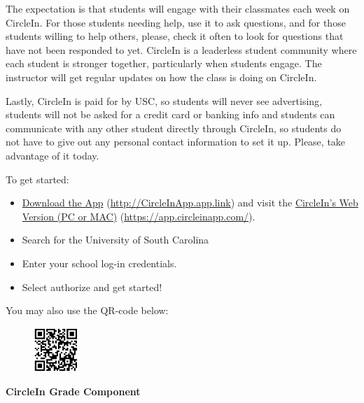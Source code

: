 \documentclass[11pt,letterpaper]{article}
\begin{document}
The expectation is that students will engage with their classmates each week on CircleIn. For those students needing help, use it to ask questions, and for those students willing to help others, please, check it often to look for questions that have not been responded to yet. CircleIn is a leaderless student community where each student is stronger together, particularly when students engage. The instructor will get regular updates on how the class is doing on CircleIn. \pspace

Lastly, CircleIn is paid for by USC, so students will never see advertising, students will not be asked for a credit card or banking info and students can communicate with any other student directly through CircleIn, so students do not have to give out any personal contact information to set it up. Please, take advantage of it today. \pspace





\newpage





To get started:
	\begin{itemize}
	\item \href{http://CircleInApp.app.link}{Download the App} (\url{http://CircleInApp.app.link}) and visit the \href{https://app.circleinapp.com/}{CircleIn's Web Version (PC or MAC)} (\url{https://app.circleinapp.com/}).
	\item Search for the University of South Carolina
	\item Enter your school log-in credentials. 
	\item Select authorize and get started! 
	\end{itemize}
You may also use the QR-code below:
	\begin{figure}[!ht]
	\centering
	\includegraphics[width=0.15\textwidth]{circlein_qr.png}
	\end{figure} \pspace

{\bfseries CircleIn Grade Component} \par
\end{document}
